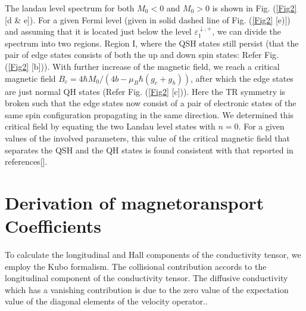 \documentclass[prb,twocolumn]{revtex4-1}
\begin{document}
The landau level spectrum for both $M_0<0$ and $M_0>0$ is shown in Fig. (\ref{Fig2} [d \& e]). For a given Fermi level (given in solid dashed line of Fig. (\ref{Fig2} [e)]) and assuming that it is located just below the level $\varepsilon_{1}^{\downarrow,+}$, we can divide the spectrum into two regions. Region I, where the QSH states still persist (that the pair of edge states consists of both the up and down spin states: Refer Fig. (\ref{Fig2} [b])). With further increase of the magnetic field, we reach a critical magnetic field $B_c=4\hbar M_0/(4b-\mu_B\hbar (g_e+g_h))$, after which the edge states are just normal QH states (Refer Fig. (\ref{Fig2} [c])). Here the TR symmetry is broken such that the edge states now consist of a pair of electronic states of the same spin configuration propagating in the same direction. We determined this critical field by equating the two Landau level states with $n=0$. For a given values of the involved parameters, this value of the critical magnetic field that separates the QSH and the QH states is found consistent with that reported in references[\cite{critical1,Hamil2}]. %


\section{Derivation of magnetoransport Coefficients}\label{Mag_Coef}
To calculate the longitudinal and Hall components of the conductivity tensor, we employ the Kubo formalism\cite{Mahan}. The collisional contribution accords to the longitudinal component of the conductivity tensor. The diffusive conductivity which has a vanishing contribution is due to the zero value of the expectation value of the diagonal elements of the velocity operator.\cite{kubo}. 
\end{document}
